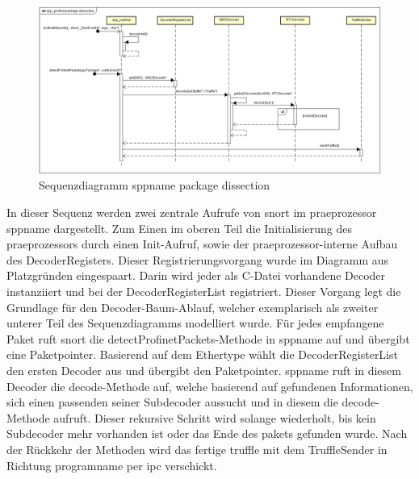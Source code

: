 \begin{figure}[H]
  \centering
  \includegraphics[width=\textwidth]{../diagramimages/spp-profinet-package-dissection.png}
  \caption[Sequenzdiagramm \gls{sppname} package dissection]{Sequenzdiagramm \gls{sppname} package dissection}
\end{figure}

In dieser Sequenz werden zwei zentrale Aufrufe von \gls{snort} im \gls{praeprozessor} \gls{sppname} dargestellt. Zum Einen im oberen Teil die Initialisierung des \gls{praeprozessor}s durch einen Init-Aufruf, sowie der \gls{praeprozessor}-interne Aufbau des DecoderRegisters. Dieser Registrierungsvorgang wurde im Diagramm aus Platzgründen eingespaart. Darin wird jeder als C-Datei vorhandene Decoder instanziiert und bei der DecoderRegisterList registriert. Dieser Vorgang legt die Grundlage für den Decoder-Baum-Ablauf, welcher exemplarisch als zweiter unterer Teil des Sequenzdiagramms modelliert wurde. Für jedes empfangene Paket ruft \gls{snort} die detectProfinetPackets-Methode in \gls{sppname} auf und übergibt eine Paketpointer. Basierend auf dem Ethertype wählt die DecoderRegisterList den ersten Decoder aus und übergibt den Paketpointer. \gls{sppname} ruft in diesem Decoder die decode-Methode auf, welche basierend auf gefundenen Informationen, sich einen passenden seiner Subdecoder aussucht und in diesem die decode-Methode aufruft. Dieser rekursive Schritt wird solange wiederholt, bis kein Subdecoder mehr vorhanden ist oder das Ende des \gls{paket}s gefunden wurde.
Nach der Rückkehr der Methoden wird das fertige \gls{truffle} mit dem TruffleSender in Richtung \gls{programname} per \gls{ipc} verschickt.
